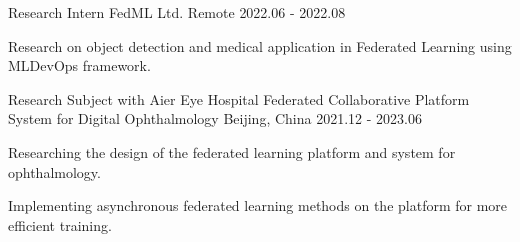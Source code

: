 



\begin{cventries}
\cventry
{Research Intern} %
{FedML Ltd.} %
{Remote} %
{2022.06 - 2022.08} %
{
    \begin{cvitems}
        \item {Research on object detection and medical application in Federated Learning using MLDevOps framework.}
    \end{cvitems}
}

\cventry
{Research Subject with Aier Eye Hospital} %
{Federated Collaborative Platform System for Digital Ophthalmology} %
{Beijing, China} %
{2021.12 - 2023.06} %
{
    \begin{cvitems}
        \item {Researching the design of the federated learning platform and system for ophthalmology.}
        \item {Implementing asynchronous federated learning methods on the platform for more efficient training.}
    \end{cvitems}
}


\end{cventries}



